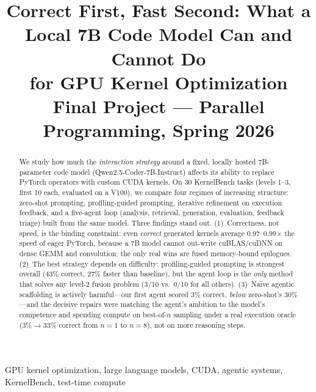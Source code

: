 \documentclass[conference]{IEEEtran}
\begin{document}
\title{Correct First, Fast Second: What a Local 7B Code Model Can and Cannot Do\\
for GPU Kernel Optimization\\
{\footnotesize Final Project --- Parallel Programming, Spring 2026}}

\author{%
%
}

\maketitle

\begin{abstract}
We study how much the \emph{interaction strategy} around a fixed, locally hosted
7B-parameter code model (Qwen2.5-Coder-7B-Instruct) affects its ability to replace
PyTorch operators with custom CUDA kernels. On 30 KernelBench tasks (levels 1--3,
first 10 each, evaluated on a V100), we compare four regimes of increasing
structure: zero-shot prompting, profiling-guided prompting, iterative refinement on
execution feedback, and a five-agent loop (analysis, retrieval, generation,
evaluation, feedback triage) built from the same model. Three findings stand out.
(1)~Correctness, not speed, is the binding constraint: even \emph{correct} generated
kernels average 0.97--0.99$\times$ the speed of eager PyTorch, because a 7B model
cannot out-write cuBLAS/cuDNN on dense GEMM and convolution; the only real wins are
fused memory-bound epilogues. (2)~The best strategy depends on difficulty:
profiling-guided prompting is strongest overall (43\% correct, 27\% faster than
baseline), but the agent loop is the \emph{only} method that solves any level-2
fusion problem (3/10 vs.\ 0/10 for all others). (3)~Na\"ive agentic scaffolding is
actively harmful---our first agent scored 3\% correct, \emph{below} zero-shot's
30\%---and the decisive repairs were matching the agent's ambition to the model's
competence and spending compute on best-of-$n$ sampling under a real execution
oracle (3\%$\to$33\% correct from $n{=}1$ to $n{=}8$), not on more reasoning steps.
\end{abstract}

\begin{IEEEkeywords}
GPU kernel optimization, large language models, CUDA, agentic systems, KernelBench, test-time compute
\end{IEEEkeywords}
\end{document}
